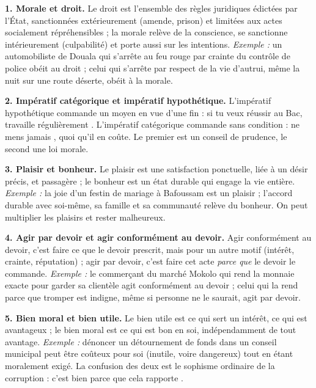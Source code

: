 \documentclass[11pt]{article}
\newcommand{\cle}[1]{{\popxbold\color{popdark}#1}}
\begin{document}
\begin{corrige}

\textbf{1. \cle{Morale} et \cle{droit}.} Le droit est l'ensemble des règles juridiques édictées par l'État, sanctionnées extérieurement (amende, prison) et limitées aux actes socialement répréhensibles ; la morale relève de la conscience, se sanctionne intérieurement (culpabilité) et porte aussi sur les intentions. \emph{Exemple :} un automobiliste de Douala qui s'arrête au feu rouge par crainte du contrôle de police obéit au droit ; celui qui s'arrête par respect de la vie d'autrui, même la nuit sur une route déserte, obéit à la morale.

\textbf{2. \cle{Impératif catégorique} et \cle{impératif hypothétique}.} L'impératif hypothétique commande un moyen en vue d'une fin : \guillemotleft si tu veux réussir au Bac, travaille régulièrement \guillemotright. L'impératif catégorique commande sans condition : \guillemotleft ne mens jamais \guillemotright, quoi qu'il en coûte. Le premier est un conseil de prudence, le second une loi morale.

\textbf{3. \cle{Plaisir} et \cle{bonheur}.} Le plaisir est une satisfaction ponctuelle, liée à un désir précis, et passagère ; le bonheur est un état durable qui engage la vie entière. \emph{Exemple :} la joie d'un festin de mariage à Bafoussam est un plaisir ; l'accord durable avec soi-même, sa famille et sa communauté relève du bonheur. On peut multiplier les plaisirs et rester malheureux.

\textbf{4. \cle{Agir par devoir} et \cle{agir conformément au devoir}.} Agir conformément au devoir, c'est faire ce que le devoir prescrit, mais pour un autre motif (intérêt, crainte, réputation) ; agir par devoir, c'est faire cet acte \emph{parce que} le devoir le commande. \emph{Exemple :} le commerçant du marché Mokolo qui rend la monnaie exacte pour garder sa clientèle agit conformément au devoir ; celui qui la rend parce que tromper est indigne, même si personne ne le saurait, agit par devoir.

\textbf{5. \cle{Bien moral} et \cle{bien utile}.} Le bien utile est ce qui sert un intérêt, ce qui est avantageux ; le bien moral est ce qui est bon en soi, indépendamment de tout avantage. \emph{Exemple :} dénoncer un détournement de fonds dans un conseil municipal peut être coûteux pour soi (inutile, voire dangereux) tout en étant moralement exigé. La confusion des deux est le sophisme ordinaire de la corruption : \guillemotleft c'est bien parce que cela rapporte \guillemotright.
\end{corrige}
\end{document}

